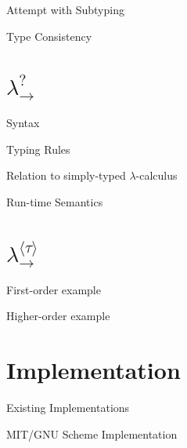 \documentclass[presentation]{beamer}
\begin{document}
\begin{frame}[label={sec:orga1eeddf}]{Attempt with Subtyping}
\end{frame}
\begin{frame}[label={sec:orgb5e6399}]{Type Consistency}
\end{frame}
\section{\(\lambda_{\rightarrow}^?\)}
\label{sec:org1741458}
\begin{frame}[label={sec:orgc9834ea}]{Syntax}
\end{frame}
\begin{frame}[label={sec:orga5189c8}]{Typing Rules}
\end{frame}
\begin{frame}[label={sec:orga9b7c6a}]{Relation to simply-typed \(\lambda\)-calculus}
\end{frame}
\begin{frame}[label={sec:orgb84a370}]{Run-time Semantics}
\end{frame}
\section{\(\lambda_{\rightarrow}^{\langle\tau\rangle}\)}
\label{sec:org4edfcdd}
\begin{frame}[label={sec:orgc4b441c}]{First-order example}
\end{frame}
\begin{frame}[label={sec:org39c3398}]{Higher-order example}
\end{frame}
\section{Implementation}
\label{sec:org338c809}
\begin{frame}[label={sec:orgff5b5f2}]{Existing Implementations}
\end{frame}
\begin{frame}[label={sec:org4671385}]{MIT/GNU Scheme Implementation}
\end{frame}
\end{document}
